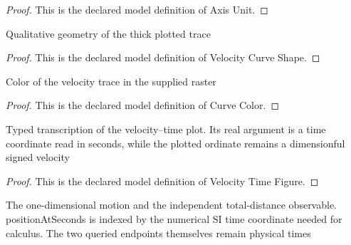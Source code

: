\begin{proof}
  This is the declared model definition of Axis Unit.
\end{proof}
\begin{definition}
  \label{def:physics:phyx-mini-0672:phyxminiproblems-problemphyxmini0672-velocitycurveshape}
  Qualitative geometry of the thick plotted trace
\end{definition}
\begin{proof}
  This is the declared model definition of Velocity Curve Shape.
\end{proof}
\begin{definition}
  \label{def:physics:phyx-mini-0672:phyxminiproblems-problemphyxmini0672-curvecolor}
  Color of the velocity trace in the supplied raster
\end{definition}
\begin{proof}
  This is the declared model definition of Curve Color.
\end{proof}
\begin{definition}
  \label{def:physics:phyx-mini-0672:phyxminiproblems-problemphyxmini0672-velocitytimefigure}
  Typed transcription of the velocity--time plot. Its real argument is a time coordinate read in seconds, while the plotted ordinate remains a dimensionful signed velocity
\end{definition}
\begin{proof}
  This is the declared model definition of Velocity Time Figure.
\end{proof}
\begin{definition}
  \label{def:physics:phyx-mini-0672:phyxminiproblems-problemphyxmini0672-onedimensionalmotion}
  The one-dimensional motion and the independent total-distance observable. positionAtSeconds is indexed by the numerical SI time coordinate needed for calculus. The two queried endpoints themselves remain physical times
\end{definition}
